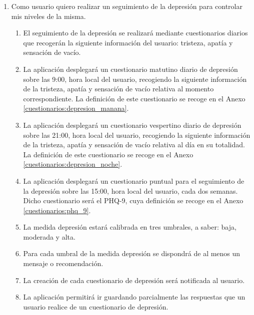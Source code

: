         \begin{enumerate}[resume=req-usuario,label=\textbf{\texttt{RU-\arabic*}}]
            \item \label{req:usuario:seguimiento_depresion} Como usuario quiero realizar un seguimiento de la depresión para controlar mis niveles de la misma.
            \begin{enumerate}[resume=req-funcionales,label=\textbf{\texttt{RF-\arabic*}}]
                \item \label{req:funcionales:depresion_diario_info} El seguimiento de la depresión se realizará mediante cuestionarios diarios que recogerán la siguiente información del usuario: tristeza, apatía y sensación de vacío.
                \item \label{req:funcionales:depresion_diario_manana} La aplicación desplegará un cuestionario matutino diario de depresión sobre las 9:00, hora local del usuario, recogiendo la siguiente información de la tristeza, apatía y sensación de vacío relativa al momento correspondiente. La definición de este cuestionario se recoge en el Anexo \ref{cuestionarios:depresion_manana}.
                \item \label{req:funcionales:depresion_diario_noche}  La aplicación desplegará un cuestionario vespertino diario de depresión sobre las 21:00, hora local del usuario, recogiendo la siguiente información de la tristeza, apatía y sensación de vacío relativa al día en su totalidad. La definición de este cuestionario se recoge en el Anexo \ref{cuestionarios:depresion_noche}.
                \item \label{req:funcionales:depresion_puntual} La aplicación desplegará un cuestionario puntual para el seguimiento de la depresión sobre las 15:00, hora local del usuario, cada dos semanas. Dicho cuestionario será el PHQ-9, cuya definición se recoge en el Anexo \ref{cuestionarios:phq_9}.
                \item \label{req:funcionales:depresion_umbrales} La medida depresión estará calibrada en tres umbrales, a saber: baja, moderada y alta.
                \item \label{req:funcionales:depresion_umbrales_consejo} Para cada umbral de la medida depresión se dispondrá de al menos un mensaje o recomendación.
                \item \label{req:funcionales:depresion_notificacion} La creación de cada cuestionario de depresión será notificada al usuario.
                \item \label{req:funcionales:depresion_cuestionario_aplazar} La aplicación permitirá ir guardando parcialmente las respuestas que un usuario realice de un cuestionario de depresión.

\end{enumerate}
\end{enumerate}
